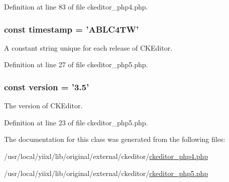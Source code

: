 Definition at line 83 of file ckeditor\_\-php4.php.

\hypertarget{classCKEditor_a60f5680e2f56092a5803e2e95315eb88}{
\subsubsection[{timestamp}]{\setlength{\rightskip}{0pt plus 5cm}const {\bf timestamp} = 'ABLC4TW'}}
\label{classCKEditor_a60f5680e2f56092a5803e2e95315eb88}
A constant string unique for each release of CKEditor. 

Definition at line 27 of file ckeditor\_\-php5.php.

\hypertarget{classCKEditor_a265a39dcf2f0b7c6b96574362aa01ad9}{
\subsubsection[{version}]{\setlength{\rightskip}{0pt plus 5cm}const {\bf version} = '3.5'}}
\label{classCKEditor_a265a39dcf2f0b7c6b96574362aa01ad9}
The version of CKEditor. 

Definition at line 23 of file ckeditor\_\-php5.php.



The documentation for this class was generated from the following files:\begin{DoxyCompactItemize}
\item 
/usr/local/yiixl/lib/original/external/ckeditor/\hyperlink{ckeditor__php4_8php}{ckeditor\_\-php4.php}\item 
/usr/local/yiixl/lib/original/external/ckeditor/\hyperlink{ckeditor__php5_8php}{ckeditor\_\-php5.php}\end{DoxyCompactItemize}
